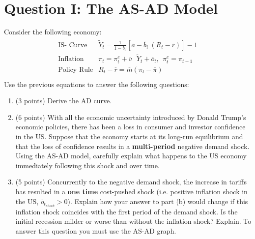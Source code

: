 \documentclass[letterpaper,12pt]{article}
\theoremstyle{dotlessS}
\begin{document}
\section*{Question I: The AS-AD Model}
Consider the following economy:
\begin{eqnarray*}
\begin{array}{ll}
\text{IS- Curve} & \widetilde{Y}_t=\frac{1}{1-b_c}\left[\overline{a}-\overline{b}_i \: (R_t-\overline{r})\right]-1 \\[1.4ex]
\text{Inflation} & \pi_t=\pi^e_t+\overline{v} \: \: \: \widetilde{Y}_t+\overline{o}_t, \: \: \pi^e_t=\pi_{t-1}  \\[1.4ex]
\text{Policy Rule} & R_t-\overline{r}=\overline{m}(\pi_t-\overline{\pi})  \\[1.4ex]
\end{array}
\end{eqnarray*}
Use the previous equations to answer the following questions:
\begin{enumerate}[label=(\alph*)]
\item (3 points) Derive the AD curve.
\item (6 points) With all the economic uncertainty introduced by Donald Trump's economic policies, there has been a loss in consumer and investor confidence in the US. Suppose that the economy starts at its long-run equilibrium and that the loss of confidence results in a \textbf{multi-period} negative demand shock. Using the AS-AD model, carefully explain what happens to the US economy immediately following this shock and over time.
\item (5 points) Concurrently to the negative demand shock, the increase in tariffs has resulted in a \textbf{one time} cost-pushed shock (i.e. positive inflation shock in the US, $\overline{o}_{t_{shock}}>0$).  Explain how your answer to part (b) would change if this inflation shock coincides with the first period of the demand shock. Is the initial recession milder or worse than without the inflation shock? Explain. To answer this question you must use the AS-AD graph.
\end{enumerate}
\end{document}
